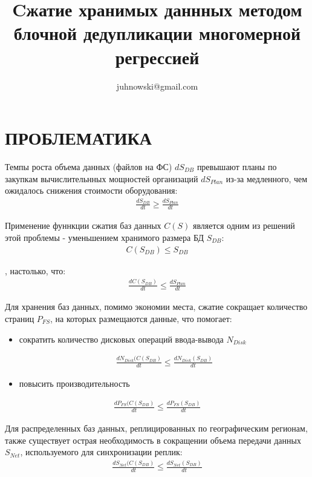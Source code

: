 \documentclass[12pt,a4paper]{article}
\title{Cжатие хранимых даннных методом блочной дедупликации многомерной регрессией}
\author{juhnowski@gmail.com}
\begin{document}
\maketitle
\section{ПРОБЛЕМАТИКА}

Темпы роста объема данных (файлов на ФС) $dS_{DB}$ превышают планы по закупкам вычислительнных мощностей организаций $dS_{Plan}$ из-за медленного, чем ожидалось снижения стоимости оборудования: 
  \begin{align}
    \frac{dS_{DB}}{dt} \geq \frac{dS_{Plan}}{dt} 
  \end{align}

Применение фуннкции сжатия баз данных $C(S)$ является одним из решений этой проблемы -  уменьшением хранимого размера БД $S_{DB}$:
\begin{align}
    C(S_{DB}) \leq S_{DB}
\end{align}

, настолько, что:
  \begin{align}
    \frac{dC(S_{DB})}{dt} \leq \frac{dS_{Plan}}{dt} 
  \end{align}

Для хранения баз данных, помимо экономии места, сжатие сокращает количество страниц $P_{FS}$, на которых размещаются данные, что помогает:
\begin{itemize}
    \item  сократить количество дисковых операций ввода-вывода $N_{Disk}$
 
    \begin{align}
    \frac{dN_{Disk}(C(S_{DB})}{dt} \leq \frac{dN_{Disk}(S_{DB})}{dt} 
  \end{align}

    \item повысить производительность 
 \end{itemize}

  \begin{align}
    \frac{dP_{FS}(C(S_{DB})}{dt} \leq \frac{dP_{FS}(S_{DB})}{dt} 
  \end{align}

 Для распределенных баз данных, реплицированных по географическим регионам, также существует острая необходимость в сокращении объема передачи данных $S_{Net}$, используемого для синхронизации реплик:
  \begin{align}
    \frac{dS_{Net}(C(S_{DB})}{dt} \leq \frac{dS_{Net}(S_{DB})}{dt} 
  \end{align}
\end{document}
